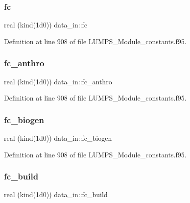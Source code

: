 \subsubsection{\texorpdfstring{fc}{fc}}
{\footnotesize\ttfamily real (kind(1d0)) data\+\_\+in\+::fc}



Definition at line 908 of file L\+U\+M\+P\+S\+\_\+\+Module\+\_\+constants.\+f95.

\mbox{\label{namespacedata__in_ad77982daffd6bf19ea51d6635d9d2009}} 
\subsubsection{\texorpdfstring{fc\+\_\+anthro}{fc\_anthro}}
{\footnotesize\ttfamily real (kind(1d0)) data\+\_\+in\+::fc\+\_\+anthro}



Definition at line 908 of file L\+U\+M\+P\+S\+\_\+\+Module\+\_\+constants.\+f95.

\mbox{\label{namespacedata__in_a446b6dc73d9c2e2518917361d9b526b3}} 
\subsubsection{\texorpdfstring{fc\+\_\+biogen}{fc\_biogen}}
{\footnotesize\ttfamily real (kind(1d0)) data\+\_\+in\+::fc\+\_\+biogen}



Definition at line 908 of file L\+U\+M\+P\+S\+\_\+\+Module\+\_\+constants.\+f95.

\mbox{\label{namespacedata__in_a3c13cce56632f598e61b00bccdc94e4a}} 
\subsubsection{\texorpdfstring{fc\+\_\+build}{fc\_build}}
{\footnotesize\ttfamily real (kind(1d0)) data\+\_\+in\+::fc\+\_\+build}



